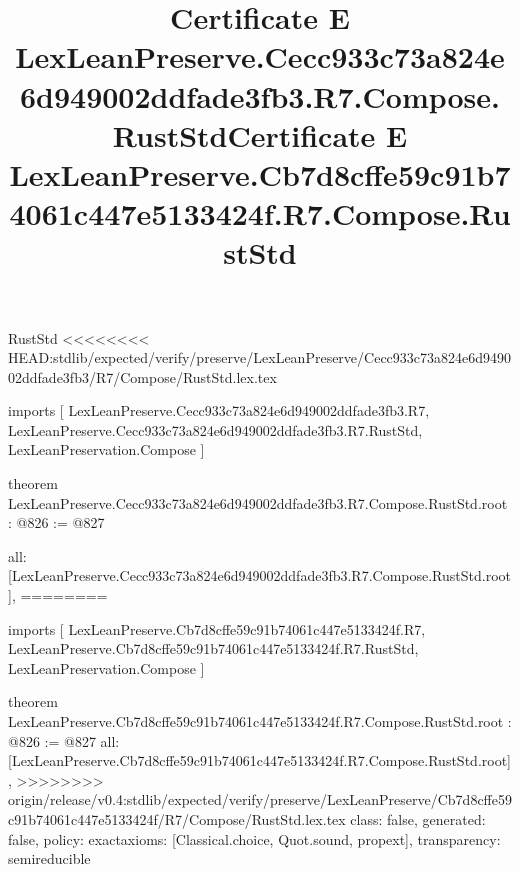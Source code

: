 \begin{lexlean}{RustStd}
<<<<<<<< HEAD:stdlib/expected/verify/preserve/LexLeanPreserve/Cecc933c73a824e6d949002ddfade3fb3/R7/Compose/RustStd.lex.tex
\title{Certificate E LexLeanPreserve.Cecc933c73a824e6d949002ddfade3fb3.R7.Compose.RustStd}
\begin{coremodule}
imports [
  LexLeanPreserve.Cecc933c73a824e6d949002ddfade3fb3.R7,
  LexLeanPreserve.Cecc933c73a824e6d949002ddfade3fb3.R7.RustStd,
  LexLeanPreservation.Compose
]

theorem LexLeanPreserve.Cecc933c73a824e6d949002ddfade3fb3.R7.Compose.RustStd.root : @826 := @827 {
  all: [LexLeanPreserve.Cecc933c73a824e6d949002ddfade3fb3.R7.Compose.RustStd.root],
========
\title{Certificate E LexLeanPreserve.Cb7d8cffe59c91b74061c447e5133424f.R7.Compose.RustStd}
\begin{coremodule}
imports [
  LexLeanPreserve.Cb7d8cffe59c91b74061c447e5133424f.R7,
  LexLeanPreserve.Cb7d8cffe59c91b74061c447e5133424f.R7.RustStd,
  LexLeanPreservation.Compose
]

theorem LexLeanPreserve.Cb7d8cffe59c91b74061c447e5133424f.R7.Compose.RustStd.root : @826 := @827 {
  all: [LexLeanPreserve.Cb7d8cffe59c91b74061c447e5133424f.R7.Compose.RustStd.root],
>>>>>>>> origin/release/v0.4:stdlib/expected/verify/preserve/LexLeanPreserve/Cb7d8cffe59c91b74061c447e5133424f/R7/Compose/RustStd.lex.tex
  class: false,
  generated: false,
  policy: exact{axioms: [Classical.choice, Quot.sound, propext]},
  transparency: semireducible
}


\end{coremodule}}
\end{coremodule}
\end{lexlean}

